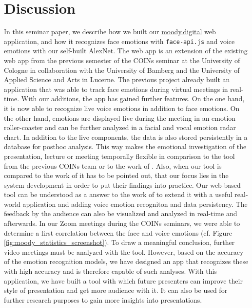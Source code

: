 \section{Discussion}
\label{sec:Discussion}
In this seminar paper, we describe how we built our \url{moody.digital} web application, and how it recognizes face emotions with \texttt{face-api.js} and voice emotions with our self-built AlexNet. The web app is an extension of the existing web app from the previous semester of the COINs seminar at the University of Cologne in collaboration with the University of Bamberg and the University of Applied Science and Arts in Lucerne. The previous project already built an application that was able to track face emotions during virtual meetings in real-time. With our additions, the app has gained further features. On the one hand, it is now able to recognize live voice emotions in addition to face emotions. On the other hand, emotions are displayed live during the meeting in an emotion roller-coaster and can be further analyzed in a facial and vocal emotion radar chart. In addition to the live components, the data is also stored persistently in a database for posthoc analysis. This way makes the emotional investigation of the presentation, lecture or meeting temporally flexible in comparison to the tool from the previous COINs team or to the work of \citeauthor{rosler_reducing_2021}. Also, when our tool is compared to the work of \citeauthor{rosler_reducing_2021} it has to be pointed out, that our focus lies in the system development in order to put their findings into practice. Our web-based tool can be understood as a answer to the work of \citeauthor{rosler_reducing_2021} to extend it with a useful real-world application and adding voice emotion recogniton and data persistency. The feedback by the audience can also be visualized and analyzed in real-time and afterwards. In our Zoom meetings during the COINs seminars, we were able to determine a first correlation between the face and voice emotions (cf. Figure \ref{fig:moody_statistics_screenshot}). To draw a meaningful conclusion, further video meetings must be analyzed with the tool. However, based on the accuracy of the emotion recognition models, we have designed an app that recognizes these with high accuracy and is therefore capable of such analyses. 
With this application, we have built a tool with which future presenters can improve their style of presentation and get more audience with it. It can also be used for further research purposes to gain more insights into presentations.
